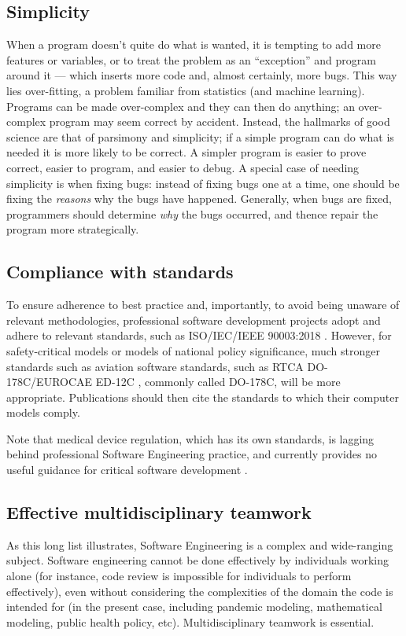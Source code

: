 \documentclass[10pt,a4paper]{article}
\begin{document}
\subsection{Simplicity} 
When a program doesn't quite do what is wanted, it is tempting to add more features or variables, or to treat the problem as an ``exception'' and program around it --- which inserts more code and, almost certainly, more bugs. This way lies over-fitting, a problem familiar from statistics (and machine learning). Programs can be made over-complex and they can then do anything; an over-complex program may seem correct by accident. Instead, the hallmarks of good science are that of parsimony and simplicity; if a simple program can do what is needed it is more likely to be correct. A simpler program is easier to prove correct, easier to program, and easier to debug. A special case of needing simplicity is when fixing bugs: instead of fixing bugs one at a time, one should be fixing the \emph{reasons\/} why the bugs have happened. Generally, when bugs are fixed, programmers should determine \emph{why\/} the bugs occurred, and thence repair the program more strategically.


\subsection{Compliance with standards}

To ensure adherence to best practice and, importantly, to avoid being unaware of relevant methodologies, professional software development projects adopt and adhere to relevant standards, such as ISO/IEC/IEEE 90003:2018 \cite{iso}. However, for safety-critical models or models of national policy significance, much stronger standards such as aviation software standards, such as RTCA DO-178C/EUROCAE ED-12C \cite{178C}, commonly called DO-178C, will be more appropriate. Publications should then cite the  standards to which their computer models comply. 

Note that medical device regulation, which has its own standards, is lagging behind professional Software Engineering practice, and currently provides no useful guidance for critical software development \cite{fixit}.

\subsection{Effective multidisciplinary teamwork}

As this long list illustrates, Software Engineering is a complex and wide-ranging subject. Software engineering cannot be done effectively by individuals working alone (for instance, code review is impossible for individuals to perform effectively), even without considering the complexities of the domain the code is intended for (in the present case, including pandemic modeling, mathematical modeling, public health policy, etc). Multidisciplinary teamwork is essential.
\end{document}
